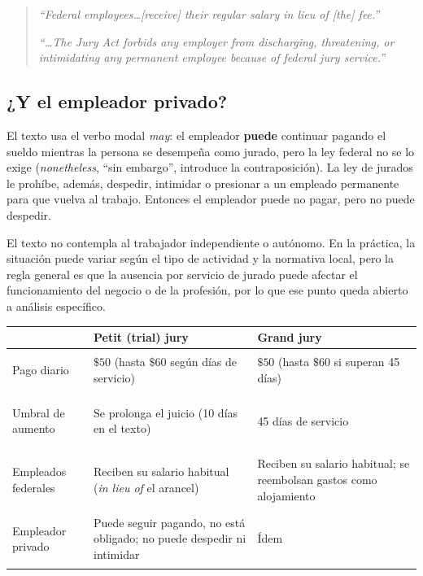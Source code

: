\documentclass[12pt,oneside]{book}
\begin{document}
\begin{quote}
\textit{``Federal employees\ldots [receive] their regular salary in lieu of [the] fee.''}

\textit{``\ldots The Jury Act forbids any employer from discharging, threatening, or intimidating any permanent employee because of federal jury service.''}
\end{quote}

\subsection{¿Y el empleador privado?}

El texto usa el verbo modal \textit{may}: el empleador \textbf{puede} continuar pagando el sueldo mientras la persona se desempeña como jurado, pero la ley federal no se lo exige (\textit{nonetheless}, ``sin embargo'', introduce la contraposición). La ley de jurados le prohíbe, además, despedir, intimidar o presionar a un empleado permanente para que vuelva al trabajo. Entonces el empleador puede no pagar, pero no puede despedir.

El texto no contempla al trabajador independiente o autónomo. En la práctica, la situación puede variar según el tipo de actividad y la normativa local, pero la regla general es que la ausencia por servicio de jurado puede afectar el funcionamiento del negocio o de la profesión, por lo que ese punto queda abierto a análisis específico.

\begin{table}[H]
\centering
\small
\renewcommand{\arraystretch}{1.25}
\begin{tabularx}{\textwidth}{@{}>{\bfseries\raggedright\arraybackslash}p{}YY@{}}
\toprule
 & \textbf{Petit (trial) jury} & \textbf{Grand jury} \\
\midrule
Pago diario & $\$50$ (hasta $\$60$ según días de servicio) & $\$50$ (hasta $\$60$ si superan 45 días) \\
Umbral de aumento & Se prolonga el juicio (10 días en el texto) & 45 días de servicio \\
Empleados federales & Reciben su salario habitual (\textit{in lieu of} el arancel) & Reciben su salario habitual; se reembolsan gastos como alojamiento \\
Empleador privado & Puede seguir pagando, no está obligado; no puede despedir ni intimidar & Ídem \\
\bottomrule
\end{tabularx}
\end{table}
\end{document}
